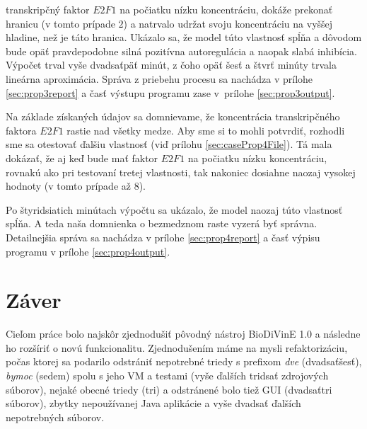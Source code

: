 \documentclass[11pt,final,oneside]{fithesis}
\begin{document}
\begin{itemize}
transkrip\v cn\'y faktor $E2F1$ na po\v ciatku n\'izku koncentr\'aciu, dok\'a\v ze prekona\v t hranicu (v tomto pr\'ipade $2$) a natrvalo udr\v zat svoju 
koncentr\'aciu na vy\v s\v sej hladine, ne\v z je t\'ato hranica. Uk\'azalo sa, \v ze model t\'uto vlastnos\v t sp\'l\v na a d\^ ovodom bude op\"a\v t 
pravdepodobne siln\'a pozit\'ivna autoregul\'acia a naopak slab\'a inhib\'icia. V\'ypo\v cet trval vy\v se dvadsa\v tp\"a\v t min\'ut, z \v coho op\"a\v t
\v ses\v t a \v stvr\v t min\'uty trvala line\'arna aproxim\'acia. Spr\'ava z priebehu procesu sa nach\'adza v pr\'ilohe \ref{sec:prop3report} a \v cas\v t
v\'ystupu programu zase v~pr\'ilohe \ref{sec:prop3output}.
\end{itemize}

Na z\'aklade z\'iskan\'ych \'udajov sa domnievame, \v ze koncentr\'acia transkrip\v cn\'eho faktora $E2F1$ 
rastie nad v\v setky medze. Aby sme si to mohli potvrdi\v t, rozhodli sme sa otestova\v t \v dal\v siu vlastnos\v t (vi\v d pr\'ilohu \ref{sec:caseProp4File}).
T\'a mala dok\'aza\v t, \v ze aj ke\v d bude ma\v t faktor $E2F1$ na po\v ciatku n\'izku koncentr\'aciu, rovnak\'u ako pri testovan\'i tretej vlastnosti,
tak nakoniec dosiahne naozaj vysokej hodnoty (v tomto pr\'ipade a\v z $8$).

Po \v styridsiatich min\'utach v\'ypo\v ctu sa uk\'azalo, \v ze model naozaj t\'uto vlastnos\v t sp\'l\v na. A teda na\v sa domnienka o bezmedznom raste 
vyzer\'a by\v t spr\'avna. Detailnej\v sia spr\'ava sa nach\'adza v pr\'ilohe \ref{sec:prop4report} a \v cas\v t v\'ypisu programu v pr\'ilohe 
\ref{sec:prop4output}.



\chapter{Z\'aver}
Cie\v lom pr\'ace bolo najsk\^ or zjednodu\v si\v t p\^ ovodn\'y n\'astroj BioDiVinE 1.0 a n\'asledne ho roz\v s\'iri\v t o nov\'u funkcionalitu. 
Zjednodu\v sen\'im m\'ame na mysli refaktoriz\'aciu, po\v cas ktorej sa podarilo odstr\'ani\v t nepotrebn\'e triedy s prefixom {\it dve} 
(dvadsa\v t\v ses\v t), {\it bymoc} (sedem) spolu s jeho VM a testami (vy\v se \v dal\v s\'ich tridsa\v t zdrojov\'ych s\'uborov), nejak\'e obecn\'e triedy 
(tri) a odstr\'anen\'e bolo tie\v z GUI (dvadsa\v ttri s\'uborov), zbytky nepou\v z\'ivanej Java aplik\'acie a vy\v se dvadsa\v t \v dal\v s\'ich 
nepotrebn\'ych s\'uborov.
\end{document}
